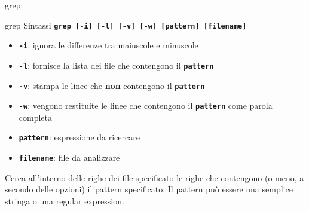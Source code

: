 \documentclass{beamer}
\begin{document}
    \begin{frame}{grep}
        \begin{block}{grep}
            \small
            Sintassi \texttt{\textbf{grep [-i] [-l] [-v] [-w] [pattern] [filename]}}

            \begin{itemize}
                \item \texttt{\textbf{-i}}: ignora le differenze tra maiuscole e minuscole
                \item \texttt{\textbf{-l}}: fornisce la lista dei file che contengono il \texttt{\textbf{pattern}}
                \item \texttt{\textbf{-v}}: stampa le linee che \textbf{non} contengono il \texttt{\textbf{pattern}}
                \item \texttt{\textbf{-w}}: vengono restituite le linee che contengono il \texttt{\textbf{pattern}} come parola completa
                \item \texttt{\textbf{pattern}}: espressione da ricercare
                \item \texttt{\textbf{filename}}: file da analizzare
            \end{itemize}

            Cerca all’interno delle righe dei file specificato le righe che
            contengono (o meno, a secondo delle opzioni) il pattern specificato. Il pattern
            può essere una semplice stringa o una regular expression.
        \end{block}
    \end{frame}
\end{document}
